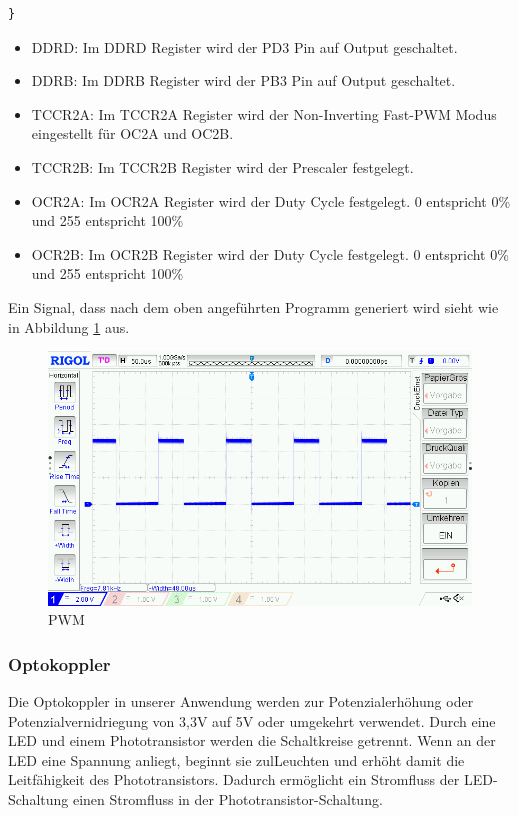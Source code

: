 \begin{itemize}
\begin{lstlisting}[caption=$\mu$C-Programm,style=C]
}
\end{lstlisting}
\newpage
\begin{itemize}
\item DDRD: Im DDRD Register wird der PD3 Pin auf Output geschaltet.
\item DDRB: Im DDRB Register wird der PB3 Pin auf Output geschaltet.
\item TCCR2A: Im TCCR2A Register wird der Non-Inverting Fast-PWM Modus eingestellt für OC2A und OC2B. 
\item TCCR2B: Im TCCR2B Register wird der Prescaler festgelegt. 
\item OCR2A: Im OCR2A Register wird der Duty Cycle festgelegt. 0 entspricht 0\% und 255 entspricht 100\% 
\item OCR2B: Im OCR2B Register wird der Duty Cycle festgelegt. 0 entspricht 0\% und 255 entspricht 100\% 
\end{itemize}
\end{itemize}

Ein Signal, dass nach dem oben angeführten Programm generiert wird sieht wie in Abbildung \ref{PWM} aus.
\begin{figure}[H] 
\begin{center}

\includegraphics[width=13cm]{Bilder/PWM/pwm}
\caption{PWM}
\label{PWM}

\end{center}
\end{figure}

\subsubsection{Optokoppler}

Die Optokoppler in unserer Anwendung werden zur Potenzialerhöhung oder Potenzialvernidriegung von 3,3V auf 5V oder umgekehrt verwendet. Durch eine LED und einem Phototransistor werden die Schaltkreise getrennt. Wenn an der LED eine Spannung anliegt, beginnt sie zulLeuchten und erhöht damit die Leitfähigkeit des Phototransistors. Dadurch ermöglicht ein Stromfluss der LED-Schaltung einen Stromfluss in der Phototransistor-Schaltung.

